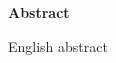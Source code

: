 

\cleardoublepage




\vspace*{2cm}
\begin{center}
{\Large \bf Abstract}
\end{center}
\vspace{1cm}

English abstract
